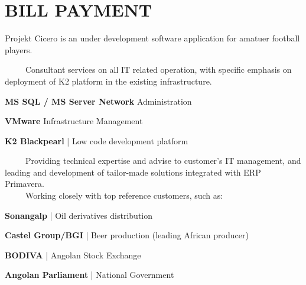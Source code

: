 \documentclass[letterpaper]{deedy-resume} %
\begin{document}
\begin{minipage}[t]{0.66\textwidth}

\section{BILL PAYMENT}



Projekt Cicero is an under development software application for amatuer football players.


\-\	\ \ \ \ Consultant services on all IT related operation, with specific emphasis on deployment of K2 platform in the existing infrastructure. \\
\vspace{\topsep}
\begin{tightitemize}
	\item \textbf{MS SQL / MS Server Network} Administration
	\item \textbf{VMware} Infrastructure Management
	\item \textbf{K2 Blackpearl} | Low code development platform
\end{tightitemize}


\-\	\ \ \ \ Providing technical expertise and advise to customer's IT management, and leading and development of tailor-made solutions integrated with ERP Primavera.\\
\-\	\ \ \ \ Working closely with top reference customers, such as:\\
\begin{tightitemize}
	\item \textbf{Sonangalp} | Oil derivatives distribution
	\item \textbf{Castel Group/BGI} | Beer production (leading African producer)
	\item \textbf{BODIVA} | Angolan Stock Exchange
	\item \textbf{Angolan Parliament} | National Government
\end{tightitemize}

\sectionspace



\end{minipage}
\end{document}
